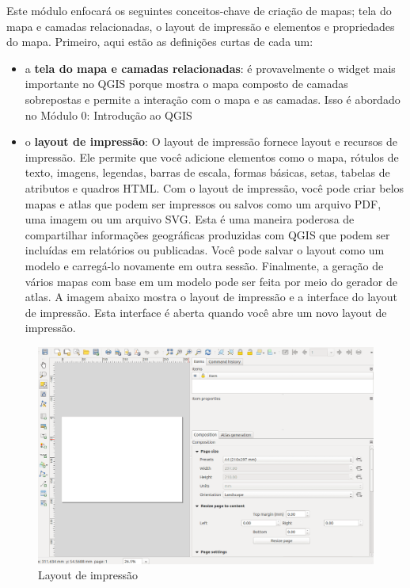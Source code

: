 \documentclass[
]{krantz}
\providecommand{\tightlist}{%
  \setlength{\itemsep}{0pt}\setlength{\parskip}{0pt}}
\begin{document}
Este módulo enfocará os seguintes conceitos-chave de criação de mapas; tela do mapa e camadas relacionadas, o layout de impressão e elementos e propriedades do mapa. Primeiro, aqui estão as definições curtas de cada um:

\begin{itemize}
\tightlist
\item
  a \textbf{tela do mapa e camadas relacionadas}: é provavelmente o widget mais importante no QGIS porque mostra o mapa composto de camadas sobrepostas e permite a interação com o mapa e as camadas. Isso é abordado no Módulo 0: Introdução ao QGIS
\item
  o \textbf{layout de impressão}: O layout de impressão fornece layout e recursos de impressão. Ele permite que você adicione elementos como o mapa, rótulos de texto, imagens, legendas, barras de escala, formas básicas, setas, tabelas de atributos e quadros HTML. Com o layout de impressão, você pode criar belos mapas e atlas que podem ser impressos ou salvos como um arquivo PDF, uma imagem ou um arquivo SVG. Esta é uma maneira poderosa de compartilhar informações geográficas produzidas com QGIS que podem ser incluídas em relatórios ou publicadas. Você pode salvar o layout como um modelo e carregá-lo novamente em outra sessão. Finalmente, a geração de vários mapas com base em um modelo pode ser feita por meio do gerador de atlas. A imagem abaixo mostra o layout de impressão e a interface do layout de impressão. Esta interface é aberta quando você abre um novo layout de impressão.
\end{itemize}

\begin{figure}
\centering
\includegraphics{media/modulo5/print_comp2.png}
\caption{Layout de impressão}
\end{figure}
\end{document}

